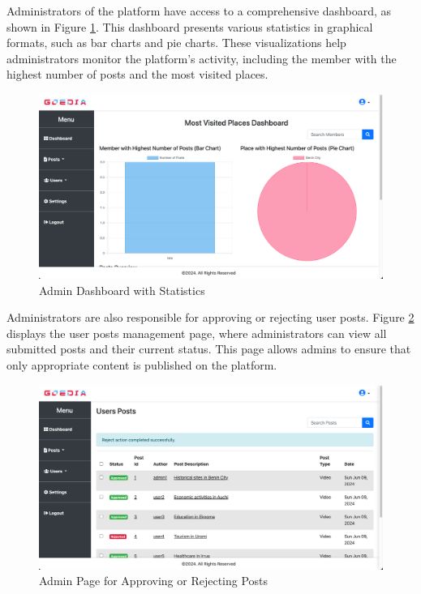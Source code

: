 Administrators of the platform have access to a comprehensive dashboard, as shown in Figure \ref{fig:admindashboard}. This dashboard presents various statistics in graphical formats, such as bar charts and pie charts. These visualizations help administrators monitor the platform's activity, including the member with the highest number of posts and the most visited places.

\begin{figure}[H]
    \centering
    \includegraphics[width=\textwidth]{admindashboard.png}
    \caption{Admin Dashboard with Statistics}
    \label{fig:admindashboard}
\end{figure}

Administrators are also responsible for approving or rejecting user posts. Figure \ref{fig:approveposts} displays the user posts management page, where administrators can view all submitted posts and their current status. This page allows admins to ensure that only appropriate content is published on the platform.

\begin{figure}[H]
    \centering
    \includegraphics[width=\textwidth]{approveposts.png}
    \caption{Admin Page for Approving or Rejecting Posts}
    \label{fig:approveposts}
\end{figure}

